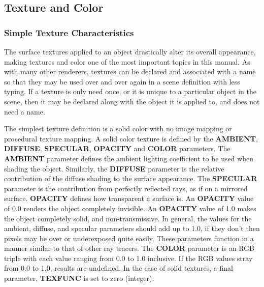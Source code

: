 \subsection{Texture and Color}
\subsubsection{Simple Texture Characteristics}
  The surface textures applied to an object drastically alter its overall
appearance, making textures and color one of the most important topics in
this manual.  As with many other renderers, textures can be declared and
associated with a name so that they may be used over and over again in 
a scene definition with less typing.  If a texture is only need once, or it
is unique to a particular object in the scene, then it may be declared along
with the object it is applied to, and does not need a name. 
 
  The simplest texture definition is a solid color with no image mapping 
or procedural texture mapping.  A solid color texture is defined by the
{\bf AMBIENT}, {\bf DIFFUSE}, {\bf SPECULAR}, {\bf OPACITY} and {\bf COLOR}  
parameters.  The {\bf AMBIENT} parameter defines the ambient lighting
coefficient to be used when shading the object.  Similarly, the {\bf DIFFUSE}
parameter is the relative contribution of the diffuse shading to the surface
appearance.  The {\bf SPECULAR} parameter is the contribution from perfectly
reflected rays, as if on a mirrored surface.  {\bf OPACITY} defines how
transparent a surface is.  An {\bf OPACITY} value of 0.0 renders the object
completely invisible.  An {\bf OPACITY} value of 1.0 makes the object
completely solid, and non-transmissive.  In general, the values for the
ambient, diffuse, and specular parameters should add up to 1.0, if they don't
then pixels may be over or underexposed quite easily.  These parameters
function in a manner similar to that of other ray tracers.  The {\bf COLOR} 
parameter is an RGB triple with each value ranging from 0.0 to 1.0 inclusive. 
If the RGB values stray from 0.0 to 1.0, results are undefined.
In the case of solid textures, a final parameter, {\bf TEXFUNC} is set to
zero (integer).

